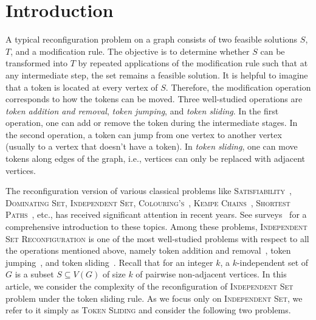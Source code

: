 \section{Introduction}

A typical reconfiguration problem on a graph consists of two feasible 
solutions $S$, $T$, and a modification rule. 
The objective is to determine whether $S$ can be transformed 
{into} $T$ by repeated applications of the modification rule 
such that at any intermediate step, the set remains a 
feasible solution. 
It {is helpful to imagine} that a token is located {at} every vertex of $S$. 
{Therefore,} the modification operation corresponds to how 
the tokens can be moved. 
Three well-studied operations are 
\emph{token addition and removal}, \emph{token jumping}, and 
\emph{token sliding}. 
In the first operation, one can add or remove the token 
{during} the intermediate stages. 
In the second operation, a token can jump from one vertex to another vertex (usually to a vertex that doesn't have a token). 
In \emph{token sliding}, one can move tokens along edges of the graph, i.e., vertices can only be replaced with {adjacent} vertices.

The reconfiguration version of various classical problems like 
\textsc{Satisfiability}~\cite{DBLP:journals/siamcomp/GopalanKMP09}, 
\textsc{Dominating Set}, \textsc{Independent Set}, 
\textsc{Colouring's}~\cite{DBLP:journals/endm/BonamyB13,DBLP:journals/jgt/FeghaliJP16}, 
\textsc{Kempe Chains}~\cite{DBLP:journals/jct/BonamyBFJ19,DBLP:journals/ejc/Feghali0P17}, 
\textsc{Shortest Paths}~\cite{DBLP:journals/tcs/Bonsma13}, etc., 
{has received significant attention in recent years.} 
{See surveys~\cite{DBLP:journals/algorithms/Nishimura18,DBLP:books/cu/p/Heuvel13} for a comprehensive introduction to these topics.} 
Among these problems, \textsc{Independent Set Reconfiguration} is 
{one of} {the most well-studied} problems with respect to 
all the operations mentioned above, 
{namely} token addition and removal~\cite{DBLP:journals/tcs/KaminskiMM12,DBLP:journals/algorithmica/MouawadN0SS17}, 
token jumping~\cite{DBLP:conf/swat/BonsmaKW14,DBLP:conf/fct/BousquetMP17,DBLP:journals/tcs/ItoDHPSUU11,DBLP:conf/tamc/ItoKOSUY14,DBLP:conf/isaac/ItoKO14}, and 
token sliding~\cite{DBLP:conf/wg/BonamyB17,DBLP:journals/tcs/DemaineDFHIOOUY15,DBLP:conf/isaac/Fox-EpsteinHOU15,DBLP:journals/tcs/HearnD05,DBLP:conf/isaac/HoangU16,DBLP:journals/talg/LokshtanovM19}. 
Recall that for an integer $k$, a $k$-independent set of $G$ is a subset 
$S \subseteq V(G)$ of size $k$ of pairwise non-adjacent vertices. 
In this article, we consider the complexity of the reconfiguration of 
\textsc{Independent Set} problem under the token sliding rule. 
As we focus only on {\textsc{Independent Set},} we refer to it simply as \textsc{Token Sliding} and consider the following two problems.

